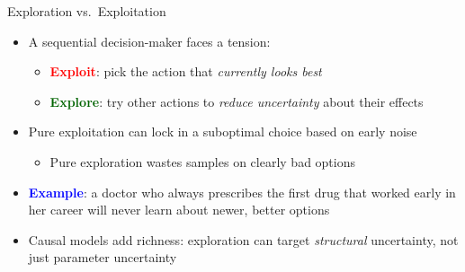 \documentclass[
  10pt,
  ignorenonframetext,
]{beamer}
\providecommand{\tightlist}{%
  \setlength{\itemsep}{0pt}\setlength{\parskip}{0pt}}
\begin{document}
\begin{frame}{Exploration vs.~Exploitation}
\label{exploration-vs.-exploitation}
\begin{itemize}
\item
  A sequential decision-maker faces a tension:

  \begin{itemize}
  \tightlist
  \item
    \textbf{\textcolor{red}{Exploit}}: pick the action that
    \emph{currently looks best}
  \item
    \textbf{\textcolor{darkgreen}{Explore}}: try other actions to
    \emph{reduce uncertainty} about their effects
  \end{itemize}
\item
  Pure exploitation can lock in a suboptimal choice based on early noise

  \begin{itemize}
  \tightlist
  \item
    Pure exploration wastes samples on clearly bad options
  \end{itemize}
\item
  \textbf{\textcolor{blue}{Example}}: a doctor who always prescribes the
  first drug that worked early in her career will never learn about
  newer, better options
\item
  Causal models add richness: exploration can target \emph{structural}
  uncertainty, not just parameter uncertainty
\end{itemize}
\end{frame}
\end{document}

